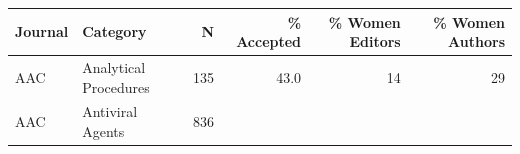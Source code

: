 \documentclass[11pt,]{article}
\begin{document}
\begin{longtable}[]{@{}llrrrr@{}}
\toprule
\begin{minipage}[b]{0.06\columnwidth}\raggedright\strut
Journal\strut
\end{minipage} & \begin{minipage}[b]{0.43\columnwidth}\raggedright\strut
Category\strut
\end{minipage} & \begin{minipage}[b]{0.04\columnwidth}\raggedleft\strut
N\strut
\end{minipage} & \begin{minipage}[b]{0.08\columnwidth}\raggedleft\strut
\% Accepted\strut
\end{minipage} & \begin{minipage}[b]{0.11\columnwidth}\raggedleft\strut
\% Women Editors\strut
\end{minipage} & \begin{minipage}[b]{0.11\columnwidth}\raggedleft\strut
\% Women Authors\strut
\end{minipage}\tabularnewline
\midrule
\endhead
\begin{minipage}[t]{0.06\columnwidth}\raggedright\strut
AAC\strut
\end{minipage} & \begin{minipage}[t]{0.43\columnwidth}\raggedright\strut
Analytical Procedures\strut
\end{minipage} & \begin{minipage}[t]{0.04\columnwidth}\raggedleft\strut
135\strut
\end{minipage} & \begin{minipage}[t]{0.08\columnwidth}\raggedleft\strut
43.0\strut
\end{minipage} & \begin{minipage}[t]{0.11\columnwidth}\raggedleft\strut
14\strut
\end{minipage} & \begin{minipage}[t]{0.11\columnwidth}\raggedleft\strut
29\strut
\end{minipage}\tabularnewline
\begin{minipage}[t]{0.06\columnwidth}\raggedright\strut
AAC\strut
\end{minipage} & \begin{minipage}[t]{0.43\columnwidth}\raggedright\strut
Antiviral Agents\strut
\end{minipage} & \begin{minipage}[t]{0.04\columnwidth}\raggedleft\strut
836\strut
\end{minipage} & \begin{minipage}[t]{0.08\columnwidth}\raggedleft\strut

\end{minipage}
\end{longtable}
\end{document}
